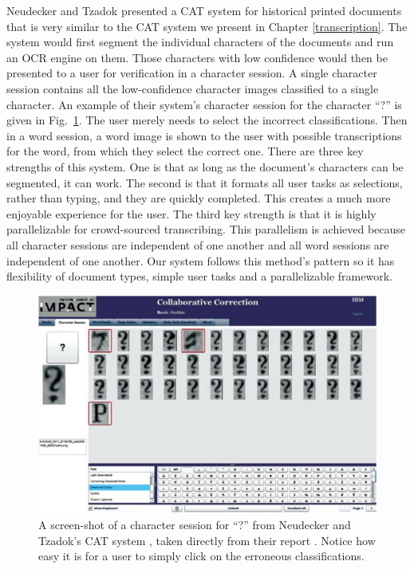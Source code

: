 \documentclass[ms,electronic,twosidetoc,letterpaper,chaptercenter,parttop,lof,lot]{byumsphd}
\begin{document}
Neudecker and Tzadok \cite{Neudecker2010} presented a CAT system for historical printed documents that is very similar to the CAT system we present in Chapter \ref{transcription}. The system would first segment the individual characters of the documents and run an OCR engine on them. Those characters with low confidence would then be presented to a user for verification in a character session. A single character session contains all the low-confidence character images classified to a single character. An example of their system's character session for the character ``?'' is given in Fig.~\ref{fig:carpet}.  The user merely needs to select the incorrect classifications. Then in a word session, a word image is shown to the user with possible transcriptions for the word, from which they select the correct one. There are three key strengths of this system. One is that as long as the document’s characters can be segmented, it can work. The second is that it formats all user tasks as selections, rather than typing, and they are quickly completed. This creates a much more enjoyable experience for the user. The third key strength is that it is highly parallelizable for crowd-sourced transcribing. This parallelism is achieved because all character sessions are independent of one another and all word sessions are independent of one another. Our system follows this method's pattern so it has flexibility of document types, simple user tasks and a parallelizable framework.

\begin{figure}
    \centering
    \includegraphics[width=.85\textwidth]{carpet}
    \caption{A screen-shot of a character session for ``?'' from Neudecker and Tzadok's CAT system \cite{Neudecker2010}, taken directly from their report \cite{Neudecker2010}. Notice how easy it is for a user to simply click on the erroneous classifications.}
    \label{fig:carpet}
\end{figure}
\end{document}
